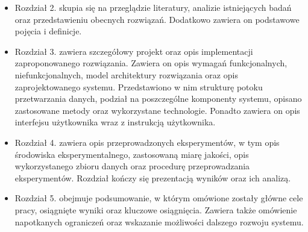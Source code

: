         \begin{itemize}
            \item {
                Rozdział 2. skupia się na przeglądzie literatury, analizie istniejących badań oraz przedstawieniu obecnych rozwiązań. Dodatkowo zawiera on podstawowe pojęcia i definicje.
            }
            \item {
                Rozdział 3. zawiera szczegółowy projekt oraz opis implementacji zaproponowanego rozwiązania. Zawiera on opis wymagań funkcjonalnych, niefunkcjonalnych, model architektury rozwiązania oraz opis zaprojektowanego systemu. Przedstawiono w nim strukturę potoku przetwarzania danych, podział na poszczególne komponenty systemu, opisano zastosowane metody oraz wykorzystane technologie. Ponadto zawiera on opis interfejsu użytkownika wraz z instrukcją użytkownika.    
            }
            \item {
                Rozdział 4. zawiera opis przeprowadzonych eksperymentów, w tym opis środowiska eksperymentalnego, zastosowaną miarę jakości, opis wykorzystanego zbioru danych oraz procedurę przeprowadzania eksperymentów. Rozdział kończy się prezentacją wyników oraz ich analizą.
            }
            \item {
                Rozdział 5. obejmuje podsumowanie, w którym omówione zostały główne cele pracy, osiągnięte wyniki oraz kluczowe osiągnięcia. Zawiera także omówienie napotkanych ograniczeń oraz wskazanie możliwości dalszego rozwoju systemu.
            }
        \end{itemize}
